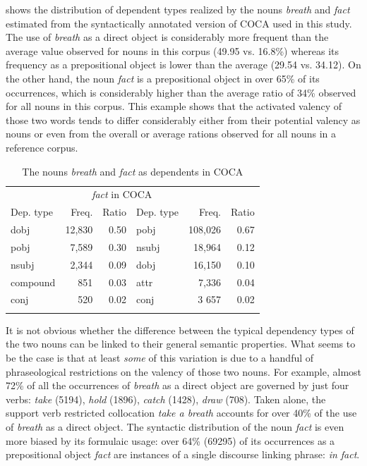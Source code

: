 \documentclass[output=paper]{langscibook}
\begin{document}
 shows the distribution of dependent types realized by the nouns \textit{breath} and \textit{fact} estimated from the syntactically annotated version of COCA used in this study. The use of \textit{breath} as a direct object is considerably more frequent than the average value observed for nouns in this corpus (49.95 vs. 16.8\%) whereas its frequency as a prepositional object is lower than the average (29.54 vs. 34.12). On the other hand, the noun \textit{fact} is a prepositional object in over 65\% of its occurrences, which is considerably higher than the average ratio of 34\% observed for all nouns in this corpus. This example shows that the activated valency of those two words tends to differ considerably either from their potential valency as nouns or even from the overall or average rations observed for all nouns in a reference corpus.


\begin{table}
\begin{tabular}{lrr lrr}
\lsptoprule
\multicolumn{3}{c}{\textit{breath} {in} {COCA}} & \multicolumn{3}{c}{\textit{fact} {in} {COCA}}\\
\cmidrule(lr){1-3}\cmidrule(lr){4-6}
Dep. type & {Freq.} & {Ratio} & {Dep.} {type} & {Freq.} & {Ratio}\\\midrule
dobj &  12,830 &  0.50 & pobj &  108,026 &  0.67\\
pobj &  7,589 &  0.30 & nsubj &  18,964 &  0.12\\
nsubj &  2,344 &  0.09 & dobj &  16,150 &  0.10\\
compound &  851 &  0.03 & attr &  7,336 &  0.04\\
conj &  520 &  0.02 & conj &  3 657 &  0.02\\
\lspbottomrule
\end{tabular}
\caption{\label{tab:pezik:6} The nouns \textit{breath} and \textit{fact} as dependents in COCA}
\end{table}

It is not obvious whether the difference between the typical dependency types of the two nouns can be linked to their general semantic properties. What seems to be the case is that at least \textit{some} of this variation is due to a handful of phraseological restrictions on the valency of those two nouns. For example, almost 72\% of all the occurrences of \textit{breath} as a direct object are governed by just four verbs: \textit{take} (5194), \textit{hold} (1896), \textit{catch} (1428), \textit{draw} (708). Taken alone, the support verb restricted collocation \textit{take a breath} accounts for over 40\% of the use of \textit{breath} as a direct object. The syntactic distribution of the noun \textit{fact} is even more biased by its formulaic usage: over 64\% (69295) of its occurrences as a prepositional object  \textit{fact} are instances of a single discourse linking phrase: \textit{in fact}. 
\end{document}
